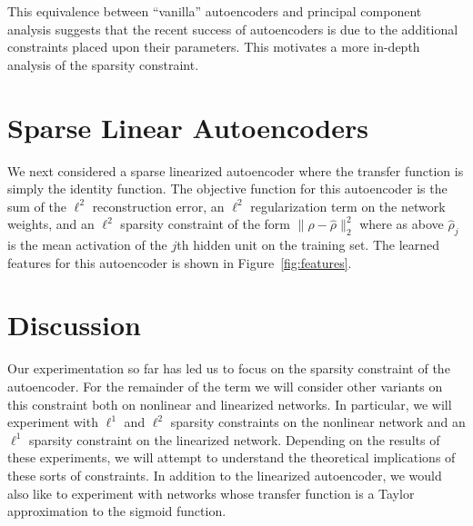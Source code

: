 \documentclass[twocolumn]{article}
\begin{document}
This equivalence between ``vanilla'' autoencoders and principal component
analysis suggests that the recent success of autoencoders is due to the
additional constraints placed upon their parameters. This motivates a more
in-depth analysis of the sparsity constraint.

\section{Sparse Linear Autoencoders}
We next considered a sparse linearized autoencoder where the transfer function
is simply the identity function. The objective function for this autoencoder is
the sum of the $\ell^2$ reconstruction error, an $\ell^2$ regularization term on
the network weights, and an $\ell^2$ sparsity constraint of the form
$\|\rho-\hat\rho\|_2^2$ where as above $\hat\rho_j$ is the mean activation of
the $j$th hidden unit on the training set. The learned features for this
autoencoder is shown in Figure~\ref{fig:features}.

\section{Discussion}
Our experimentation so far has led us to focus on the sparsity constraint of the
autoencoder.  For the remainder of the term we will consider other variants on
this constraint both on nonlinear and linearized networks. In particular, we
will experiment with $\ell^1$ and $\ell^2$ sparsity constraints on the nonlinear
network and an $\ell^1$ sparsity constraint on the linearized network. Depending
on the results of these experiments, we will attempt to understand the
theoretical implications of these sorts of constraints. In addition to the
linearized autoencoder, we would also like to experiment with networks whose
transfer function is a Taylor approximation to the sigmoid function.

\end{document}
